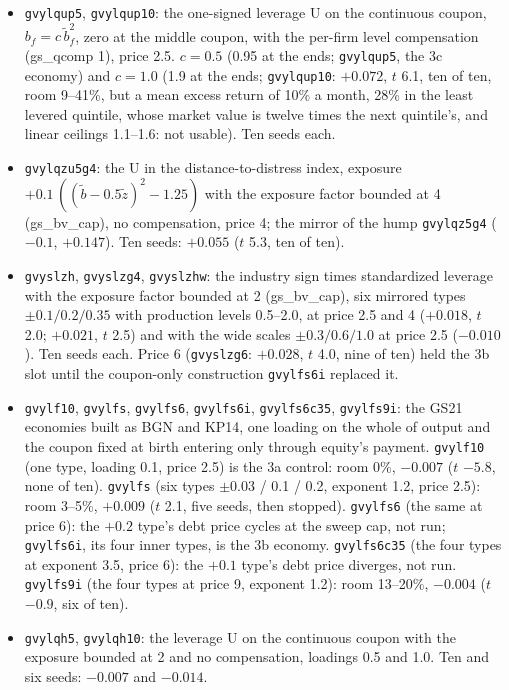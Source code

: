 \documentclass[11pt]{article}
\begin{document}
\begin{itemize}
\item \texttt{gvylqup5}, \texttt{gvylqup10}: the one-signed leverage U on the continuous coupon, $b_f = c\,\tilde b_f^2$, zero at the middle coupon, with the per-firm level compensation (gs\_qcomp 1), price 2.5. $c = 0.5$ (0.95 at the ends; \texttt{gvylqup5}, the 3c economy) and $c = 1.0$ (1.9 at the ends; \texttt{gvylqup10}: $+0.072$, $t$ 6.1, ten of ten, room 9--41\%, but a mean excess return of 10\% a month, 28\% in the least levered quintile, whose market value is twelve times the next quintile's, and linear ceilings 1.1--1.6: not usable). Ten seeds each.
\item \texttt{gvylqzu5g4}: the U in the distance-to-distress index, exposure $+0.1\,((\tilde b - 0.5\tilde z)^2 - 1.25)$ with the exposure factor bounded at 4 (gs\_bv\_cap), no compensation, price 4; the mirror of the hump \texttt{gvylqz5g4} ($-0.1$, $+0.147$). Ten seeds: $+0.055$ ($t$ 5.3, ten of ten).
\item \texttt{gvyslzh}, \texttt{gvyslzg4}, \texttt{gvyslzhw}: the industry sign times standardized leverage with the exposure factor bounded at 2 (gs\_bv\_cap), six mirrored types $\pm0.1/0.2/0.35$ with production levels 0.5--2.0, at price 2.5 and 4 ($+0.018$, $t$ 2.0; $+0.021$, $t$ 2.5) and with the wide scales $\pm0.3/0.6/1.0$ at price 2.5 ($-0.010$). Ten seeds each. Price 6 (\texttt{gvyslzg6}: $+0.028$, $t$ 4.0, nine of ten) held the 3b slot until the coupon-only construction \texttt{gvylfs6i} replaced it.
\item \texttt{gvylf10}, \texttt{gvylfs}, \texttt{gvylfs6}, \texttt{gvylfs6i}, \texttt{gvylfs6c35}, \texttt{gvylfs9i}: the GS21 economies built as BGN and KP14, one loading on the whole of output and the coupon fixed at birth entering only through equity's payment. \texttt{gvylf10} (one type, loading 0.1, price 2.5) is the 3a control: room 0\%, $-0.007$ ($t$ $-5.8$, none of ten). \texttt{gvylfs} (six types $\pm 0.03$ / 0.1 / 0.2, exponent 1.2, price 2.5): room 3--5\%, $+0.009$ ($t$ 2.1, five seeds, then stopped). \texttt{gvylfs6} (the same at price 6): the $+0.2$ type's debt price cycles at the sweep cap, not run; \texttt{gvylfs6i}, its four inner types, is the 3b economy. \texttt{gvylfs6c35} (the four types at exponent 3.5, price 6): the $+0.1$ type's debt price diverges, not run. \texttt{gvylfs9i} (the four types at price 9, exponent 1.2): room 13--20\%, $-0.004$ ($t$ $-0.9$, six of ten).
\item \texttt{gvylqh5}, \texttt{gvylqh10}: the leverage U on the continuous coupon with the exposure bounded at 2 and no compensation, loadings 0.5 and 1.0. Ten and six seeds: $-0.007$ and $-0.014$.

\end{itemize}
\end{document}
